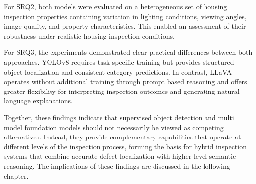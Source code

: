 For SRQ2, both models were evaluated on a heterogeneous set of housing inspection properties containing variation in lighting conditions, viewing angles, image quality, and property characteristics. This enabled an assessment of their robustness under realistic housing inspection conditions.

For SRQ3, the experiments demonstrated clear practical differences between both approaches. YOLOv8 requires task specific training but provides structured object localization and consistent category predictions. In contrast, LLaVA operates without additional training through prompt based reasoning and offers greater flexibility for interpreting inspection outcomes and generating natural language explanations.

Together, these findings indicate that supervised object detection and multi model foundation models should not necessarily be viewed as competing alternatives. Instead, they provide complementary capabilities that operate at different levels of the inspection process, forming the basis for hybrid inspection systems that combine accurate defect localization with higher level semantic reasoning. The implications of these findings are discussed in the following chapter.

